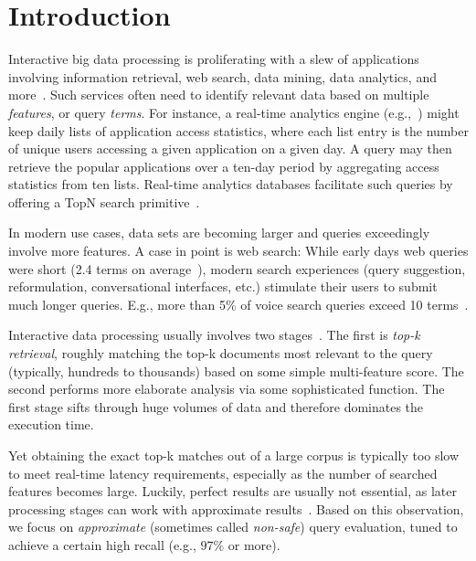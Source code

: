 \section{Introduction}
\label{sec:intro}

Interactive big data processing is proliferating with a slew of applications involving
information retrieval, web search, data mining, data analytics, and more~\cite{top-k-survey}. 
Such services often need to identify relevant data based on multiple \emph{features}, or query \emph{terms}.  
For instance, a real-time analytics engine (e.g.,~\cite{flurry}) might keep daily lists of application access statistics, where each list entry
is the number of unique users accessing a given application on a given day.  
A query may then retrieve the popular applications over a  ten-day period by aggregating  access statistics from ten lists.
Real-time analytics databases facilitate such queries by offering a TopN search primitive~\cite{druid-topN}.

In modern use cases,  data sets are becoming larger and queries exceedingly  involve more features. 
A case in point is web search:  
While  early days web queries were short (2.4 terms on average~\cite{Spink:2001:SWP:362968.362979}), 
modern search experiences (query suggestion, reformulation, conversational interfaces, etc.) stimulate their users to submit much longer queries. 
E.g., more than 5\% of voice search queries exceed 10 terms~\cite{sigir/Guy16}. 

Interactive data processing   usually involves two stages~\cite{Wang:2011}. 
The first  is \emph{top-k retrieval}, roughly matching the top-k documents most relevant to the query
(typically, hundreds to thousands) based on some simple multi-feature  score. 
The second  performs more elaborate analysis via some sophisticated function. 
The first stage  sifts through huge volumes of data and therefore dominates the execution time. 

Yet obtaining the exact top-k matches out of a large corpus is typically too slow to meet real-time latency requirements, 
especially as the number of searched features becomes large.
Luckily, 
perfect results are usually not essential, as later  processing 
stages can work with approximate results~\cite{Crane:2017,Lin:2015,Wang:2011,druid-topN}. 
Based on this observation, we focus on \emph{approximate} 
(sometimes called \emph{non-safe}) query evaluation, tuned to achieve a certain high recall (e.g., $97\%$ or more). 

